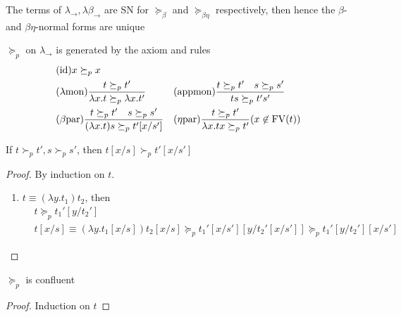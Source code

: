 \documentclass[11pt]{article}
\begin{document}
\begin{theorem}[]
The terms of \(\lambda_\to,\lambda\beta_\to\) are SN for \(\succeq_\beta\) and
\(\succeq_{\beta\eta}\) respectively, then hence the \(\beta\)- and
\(\beta \eta\)-normal forms are unique
\end{theorem}


\begin{definition}[]
\(\succeq_p\) on \(\lambda_\to\) is generated by the axiom and rules
\begin{alignat*}{2}
&(\text{id})x\succeq_p x\\
&(\lambda\text{mon})\frac{t\succeq_p t'}{\lambda x.t\succeq_p \lambda x.t'}&&
(\text{appmon})\frac{t\succeq_p t'\quad s\succeq_p s'}{ts\succeq_p t's'}\\
&(\beta\text{par})\frac{t\succeq_p t'\quad s\succeq_ps'}{(\lambda x.t)s\succeq_pt'[x/s']}
&&(\eta\text{par})\frac{t\succeq_p t'}{\lambda x.tx\succeq_pt'}
(x\not\in\text{FV}(t))
\end{alignat*}
\end{definition}

\begin{lemma}
If \(t\succ_p t',s\succ_p s'\), then \(t[x/s]\succ_p t'[x/s']\)
\end{lemma}

\begin{proof}
By induction on \(t\). 

\begin{enumerate}
\item \(t\equiv(\lambda y.t_1)t_2\), then
\begin{align*}
&t\succeq_p t_1'[y/t_2']\\
&t[x/s]\equiv(\lambda y.t_1[x/s])t_2[x/s]\succeq_p
t_1'[x/s'][y/t_2'[x/s']]\succeq_p
t_1'[y/t_2'][x/s']
\end{align*}
\end{enumerate}
\end{proof}

\begin{lemma}[]
\(\succeq_p\) is confluent
\end{lemma}

\begin{proof}
Induction on \(t\)
\end{proof}
\end{document}
